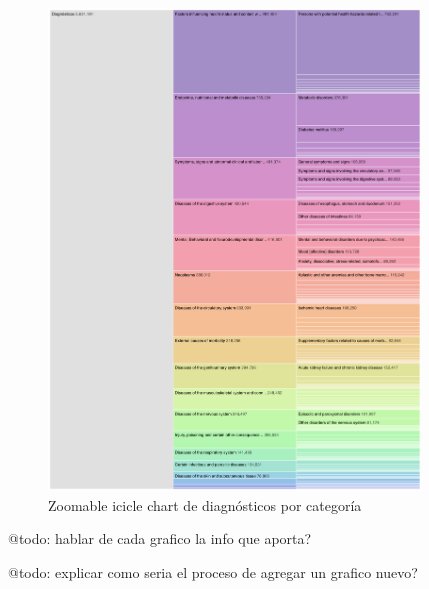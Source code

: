 \begin{figure}[H]
  \centering
  \includegraphics[width=0.88\textwidth]{imagenes/chart5.png}
  \caption{Zoomable icicle chart de diagnósticos por categoría}
  \label{fig:chart5}
\end{figure}

@todo: hablar de cada grafico la info que aporta?

@todo: explicar como seria el proceso de agregar un grafico nuevo?